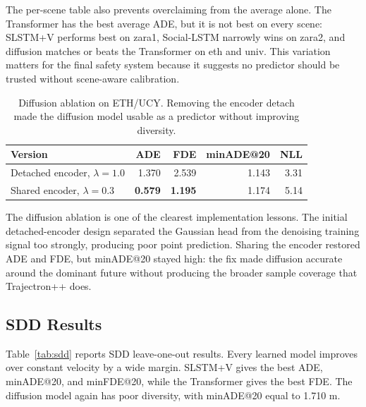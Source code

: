 \documentclass[conference]{IEEEtran}
\begin{document}
The per-scene table also prevents overclaiming from the average alone. The
Transformer has the best average ADE, but it is not best on every scene:
SLSTM+V performs best on zara1, Social-LSTM narrowly wins on zara2, and diffusion
matches or beats the Transformer on eth and univ. This variation matters for
the final safety system because it suggests no predictor should be trusted
without scene-aware calibration.

\begin{table}[t]
\caption{Diffusion ablation on ETH/UCY. Removing the encoder detach made the
diffusion model usable as a predictor without improving diversity.}
\label{tab:diffusion_ablation}
\centering
\footnotesize
\setlength{\tabcolsep}{4pt}
\begin{tabular}{@{}lrrrr@{}}
\toprule
Version & ADE & FDE & minADE@20 & NLL \\
\midrule
Detached encoder, $\lambda=1.0$ & 1.370 & 2.539 & 1.143 & 3.31 \\
Shared encoder, $\lambda=0.3$ & \textbf{0.579} & \textbf{1.195} & 1.174 & 5.14 \\
\bottomrule
\end{tabular}
\end{table}

The diffusion ablation is one of the clearest implementation lessons. The
initial detached-encoder design separated the Gaussian head from the denoising
training signal too strongly, producing poor point prediction. Sharing the
encoder restored ADE and FDE, but minADE@20 stayed high: the fix made
diffusion accurate around the dominant future without producing the
broader sample coverage that Trajectron++ does.

\subsection{SDD Results}

Table~\ref{tab:sdd} reports SDD leave-one-out results. Every learned model
improves over constant velocity by a wide margin. SLSTM+V gives the best ADE,
minADE@20, and minFDE@20, while the Transformer gives the best FDE. The
diffusion model again has poor diversity, with minADE@20 equal to 1.710 m.
\end{document}

